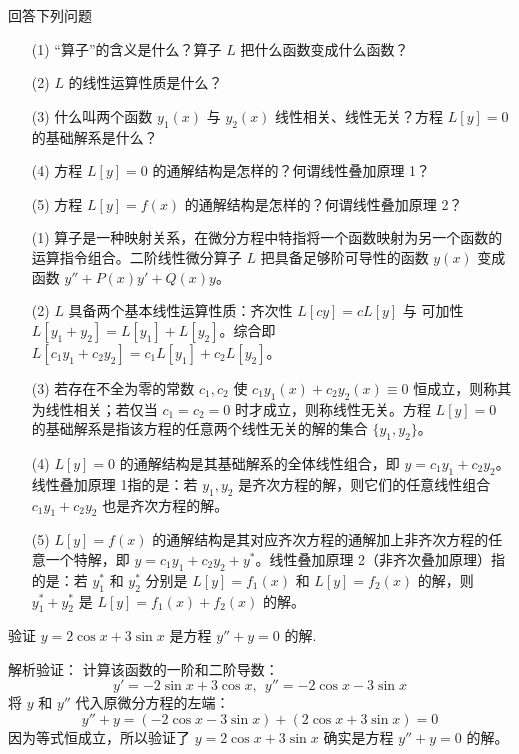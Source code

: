 \documentclass[lang=cn,11pt]{elegantbook}
\begin{document}
\begin{exercise}[基础：概念理解]
回答下列问题
\begin{enumerate}
    \item[(1)] “算子”的含义是什么？算子 $L$ 把什么函数变成什么函数？
    \item[(2)] $L$ 的线性运算性质是什么？
    \item[(3)] 什么叫两个函数 $y_1(x)$ 与 $y_2(x)$ 线性相关、线性无关？方程 $L[y]=0$ 的基础解系是什么？
    \item[(4)] 方程 $L[y]=0$ 的通解结构是怎样的？何谓线性叠加原理 1？
    \item[(5)] 方程 $L[y]=f(x)$ 的通解结构是怎样的？何谓线性叠加原理 2？
\end{enumerate}
\end{exercise}
\begin{solution}
\begin{enumerate}
    \item[(1)] 算子是一种映射关系，在微分方程中特指将一个函数映射为另一个函数的运算指令组合。二阶线性微分算子 $L$ 把具备足够阶可导性的函数 $y(x)$ 变成函数 $y'' + P(x)y' + Q(x)y$。
    \item[(2)] $L$ 具备两个基本线性运算性质：齐次性 $L[cy] = cL[y]$ 与 可加性 $L[y_1+y_2] = L[y_1]+L[y_2]$。综合即 $L[c_1y_1+c_2y_2] = c_1L[y_1] + c_2L[y_2]$。
    \item[(3)] 若存在不全为零的常数 $c_1, c_2$ 使 $c_1y_1(x)+c_2y_2(x) \equiv 0$ 恒成立，则称其为线性相关；若仅当 $c_1=c_2=0$ 时才成立，则称线性无关。方程 $L[y]=0$ 的基础解系是指该方程的任意两个线性无关的解的集合 $\{y_1, y_2\}$。
    \item[(4)] $L[y]=0$ 的通解结构是其基础解系的全体线性组合，即 $y = c_1 y_1 + c_2 y_2$。线性叠加原理 1指的是：若 $y_1, y_2$ 是齐次方程的解，则它们的任意线性组合 $c_1 y_1 + c_2 y_2$ 也是齐次方程的解。
    \item[(5)] $L[y]=f(x)$ 的通解结构是其对应齐次方程的通解加上非齐次方程的任意一个特解，即 $y = c_1 y_1 + c_2 y_2 + y^*$。线性叠加原理 2（非齐次叠加原理）指的是：若 $y_1^*$ 和 $y_2^*$ 分别是 $L[y]=f_1(x)$ 和 $L[y]=f_2(x)$ 的解，则 $y_1^* + y_2^*$ 是 $L[y]=f_1(x)+f_2(x)$ 的解。
\end{enumerate}
\end{solution}

\begin{exercise}[解的验证]
验证 $y=2\cos x+3\sin x$ 是方程 $y''+y=0$ 的解.
\end{exercise}
\begin{solution}
解析验证：
计算该函数的一阶和二阶导数：
\[
y' = -2\sin x + 3\cos x,~~y'' = -2\cos x - 3\sin x
\]
将 $y$ 和 $y''$ 代入原微分方程的左端：
\[
y'' + y = (-2\cos x - 3\sin x) + (2\cos x + 3\sin x) = 0
\]
因为等式恒成立，所以验证了 $y=2\cos x+3\sin x$ 确实是方程 $y''+y=0$ 的解。
\end{solution}
\end{document}
